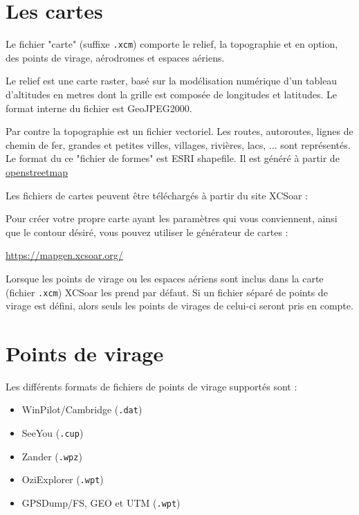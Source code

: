 \section{Les cartes}\label{sec:map}

Le fichier "carte" (suffixe \verb|.xcm|) comporte le relief, la topographie et en option, des points de virage, aérodromes et espaces aériens.

Le relief est une carte raster, basé sur la modélisation numérique d'un tableau d'altitudes en metres dont la grille est composée de longitudes et latitudes. Le format interne du fichier est GeoJPEG2000.

Par contre la topographie est un fichier vectoriel. Les routes, autoroutes, lignes de chemin de fer, grandes et petites villes, villages, rivières, lacs, ... sont représentés. Le format du ce "fichier de formes" est ESRI shapefile. Il est généré à partir de  {\href{http://www.openstreetmap.org/}{openstreetmap}}

Les fichiers de cartes peuvent être téléchargés à partir du site XCSoar :


Pour créer votre propre carte ayant les paramètres qui vous conviennent, ainsi que le contour désiré, vous pouvez utiliser le générateur de cartes :

\url{https://mapgen.xcsoar.org/}

Lorsque les points de virage ou les espaces aériens sont inclus dans la carte (fichier \verb|.xcm|) XCSoar les prend par défaut. Si un fichier séparé de points de virage est défini, alors seuls les points de virages de celui-ci seront pris en compte.

\section{Points de virage}

Les différents formats de fichiers de points de virage supportés sont :

\begin{itemize}
\item WinPilot/Cambridge (\verb|.dat|)
\item SeeYou (\verb|.cup|)
\item Zander (\verb|.wpz|)
\item OziExplorer (\verb|.wpt|)
\item GPSDump/FS, GEO et UTM (\verb|.wpt|)
\end{itemize}

